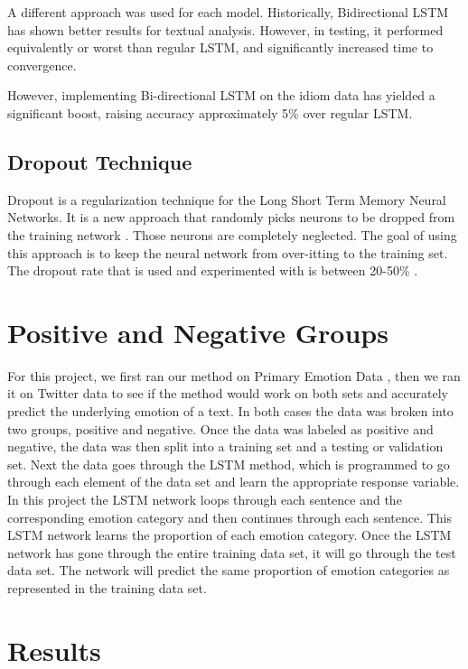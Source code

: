 \documentclass[titlepage,letterpaper]{article}
\begin{document}
A different approach was used for each model. Historically, Bidirectional LSTM has shown better results for textual analysis. However, in testing, it performed equivalently or worst than regular LSTM, and significantly increased time to convergence.

However, implementing Bi-directional LSTM on the idiom data has yielded a significant boost, raising accuracy approximately 5\% over regular LSTM.

\subsection{Dropout Technique}
Dropout is a regularization technique for the Long Short Term Memory Neural Networks. It is a new approach that randomly picks neurons to be dropped from the training network \cite{nielsen2015neural}. Those neurons are completely neglected. The goal of using this approach is to keep the neural network from over-itting to the training set. The dropout rate that is used and experimented with is between 20-50\% \cite{nielsen2015neural}.

\section{Positive and Negative Groups}

For this project, we first ran our method on Primary Emotion Data \cite{lowriwilliams}, then we ran it on Twitter data to see if the method would work on both sets and accurately predict the underlying emotion of a text. In both cases the data was broken into two groups, positive and negative. Once the data was labeled as positive and negative, the data was then split into a training set and a testing or validation set. Next the data goes through the LSTM method, which is programmed to go through each element of the data set and learn the appropriate response variable. In this project the LSTM network loops through each sentence and the corresponding emotion category and then continues through each sentence. This LSTM network learns the proportion of each emotion category. Once the LSTM network has gone through the entire training data set, it will go through the test data set. The network will predict the same proportion of emotion categories as represented in the training data set. 

\section{Results}
\end{document}

